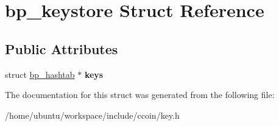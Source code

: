 \hypertarget{structbp__keystore}{\section{bp\-\_\-keystore Struct Reference}
\label{structbp__keystore}
}
\subsection*{Public Attributes}
\begin{DoxyCompactItemize}
\item 
\hypertarget{structbp__keystore_a1da633c3df1cf9e89f430f5e20af263a}{struct \hyperlink{structbp__hashtab}{bp\-\_\-hashtab} $\ast$ {\bfseries keys}}\label{structbp__keystore_a1da633c3df1cf9e89f430f5e20af263a}

\end{DoxyCompactItemize}


The documentation for this struct was generated from the following file\-:\begin{DoxyCompactItemize}
\item 
/home/ubuntu/workspace/include/ccoin/key.\-h\end{DoxyCompactItemize}
